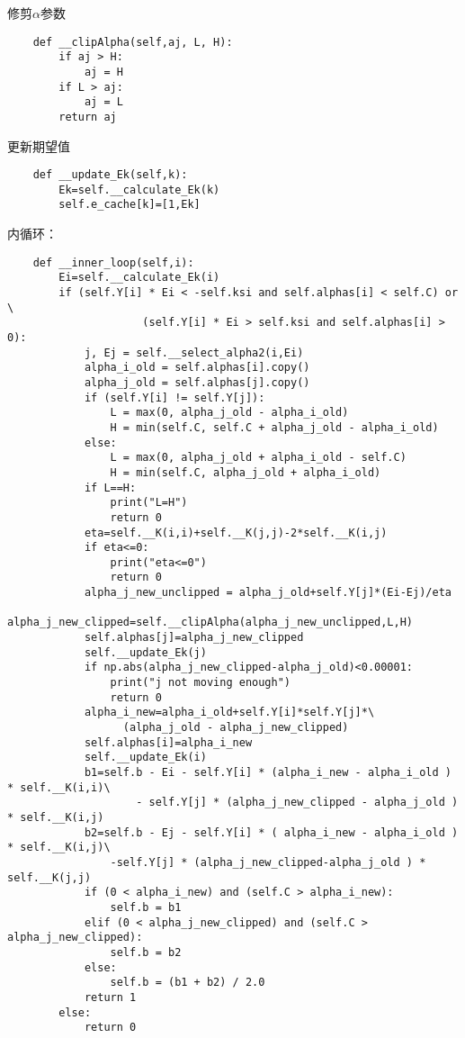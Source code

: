 \documentclass[UTF8]{ctexart}
\begin{document}
修剪$\alpha$参数
\begin{verbatim}
    def __clipAlpha(self,aj, L, H):
        if aj > H:
            aj = H
        if L > aj:
            aj = L
        return aj
\end{verbatim}

更新期望值
\begin{verbatim}
    def __update_Ek(self,k):
        Ek=self.__calculate_Ek(k)
        self.e_cache[k]=[1,Ek]
\end{verbatim}


内循环：
\begin{verbatim}
    def __inner_loop(self,i):
        Ei=self.__calculate_Ek(i)
        if (self.Y[i] * Ei < -self.ksi and self.alphas[i] < self.C) or \
                     (self.Y[i] * Ei > self.ksi and self.alphas[i] > 0):
            j, Ej = self.__select_alpha2(i,Ei)
            alpha_i_old = self.alphas[i].copy()
            alpha_j_old = self.alphas[j].copy()
            if (self.Y[i] != self.Y[j]):
                L = max(0, alpha_j_old - alpha_i_old)
                H = min(self.C, self.C + alpha_j_old - alpha_i_old)
            else:
                L = max(0, alpha_j_old + alpha_i_old - self.C)
                H = min(self.C, alpha_j_old + alpha_i_old)
            if L==H:
                print("L=H")
                return 0
            eta=self.__K(i,i)+self.__K(j,j)-2*self.__K(i,j)
            if eta<=0:
                print("eta<=0")
                return 0
            alpha_j_new_unclipped = alpha_j_old+self.Y[j]*(Ei-Ej)/eta
            alpha_j_new_clipped=self.__clipAlpha(alpha_j_new_unclipped,L,H)
            self.alphas[j]=alpha_j_new_clipped
            self.__update_Ek(j)
            if np.abs(alpha_j_new_clipped-alpha_j_old)<0.00001:
                print("j not moving enough")
                return 0
            alpha_i_new=alpha_i_old+self.Y[i]*self.Y[j]*\
                  (alpha_j_old - alpha_j_new_clipped)
            self.alphas[i]=alpha_i_new
            self.__update_Ek(i)
            b1=self.b - Ei - self.Y[i] * (alpha_i_new - alpha_i_old ) * self.__K(i,i)\
                    - self.Y[j] * (alpha_j_new_clipped - alpha_j_old ) * self.__K(i,j)
            b2=self.b - Ej - self.Y[i] * ( alpha_i_new - alpha_i_old ) * self.__K(i,j)\
                -self.Y[j] * (alpha_j_new_clipped-alpha_j_old ) * self.__K(j,j)
            if (0 < alpha_i_new) and (self.C > alpha_i_new):
                self.b = b1
            elif (0 < alpha_j_new_clipped) and (self.C > alpha_j_new_clipped):
                self.b = b2
            else:
                self.b = (b1 + b2) / 2.0
            return 1
        else:
            return 0
\end{verbatim}
\end{document}
